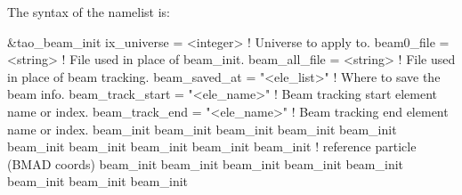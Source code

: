 {{{{{{{{{The syntax of the  namelist is:
\begin{example}
  &tao_beam_init
    ix_universe                 = <integer>    ! Universe to apply to.
    beam0_file                  = <string>     ! File used in place of beam_init.
    beam_all_file               = <string>     ! File used in place of beam tracking.
    beam_saved_at               = "<ele_list>" ! Where to save the beam info.
    beam_track_start            = "<ele_name>" ! Beam tracking start element name or index.
    beam_track_end              = "<ele_name>" ! Beam tracking end element name or index.
    beam_init%
    beam_init%
    beam_init%
    beam_init%
    beam_init%
    beam_init%
    beam_init%
    beam_init%
    beam_init%
    beam_init%
                                               !   reference particle (BMAD coords)
    beam_init%
    beam_init%
    beam_init%
    beam_init%
    beam_init%
    beam_init%
    beam_init%
    beam_init%

\end{example}}}}}}}}}}
